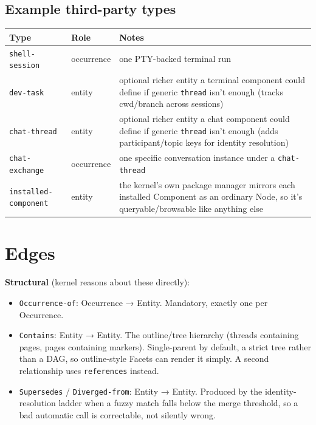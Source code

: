 \documentclass[11pt]{article}
\begin{document}
\subsection{Example third-party types}
\label{sec:org500f4f7}

\begin{center}
\begin{tabularx}{\textwidth}{llX}
\toprule
Type & Role & Notes\\
\midrule
\texttt{shell-session} & occurrence & one PTY-backed terminal run\\
\texttt{dev-task} & entity & optional richer entity a terminal component could define if generic \texttt{thread} isn't enough (tracks cwd/branch across sessions)\\
\texttt{chat-thread} & entity & optional richer entity a chat component could define if generic \texttt{thread} isn't enough (adds participant/topic keys for identity resolution)\\
\texttt{chat-exchange} & occurrence & one specific conversation instance under a \texttt{chat-thread}\\
\texttt{installed-component} & entity & the kernel's own package manager mirrors each installed Component as an ordinary Node, so it's queryable/browsable like anything else\\
\bottomrule
\end{tabularx}
\end{center}
\section{Edges}
\label{sec:orgc6e43b9}

\textbf{Structural} (kernel reasons about these directly):

\begin{itemize}
\item \texttt{Occurrence-of}: Occurrence → Entity. Mandatory, exactly one per Occurrence.
\item \texttt{Contains}: Entity → Entity. The outline/tree hierarchy (threads containing pages, pages containing markers). Single-parent by default, a strict tree rather than a DAG, so outline-style Facets can render it simply. A second relationship uses \texttt{references} instead.
\item \texttt{Supersedes} / \texttt{Diverged-from}: Entity → Entity. Produced by the identity-resolution ladder when a fuzzy match falls below the merge threshold, so a bad automatic call is correctable, not silently wrong.
\end{itemize}
\end{document}
